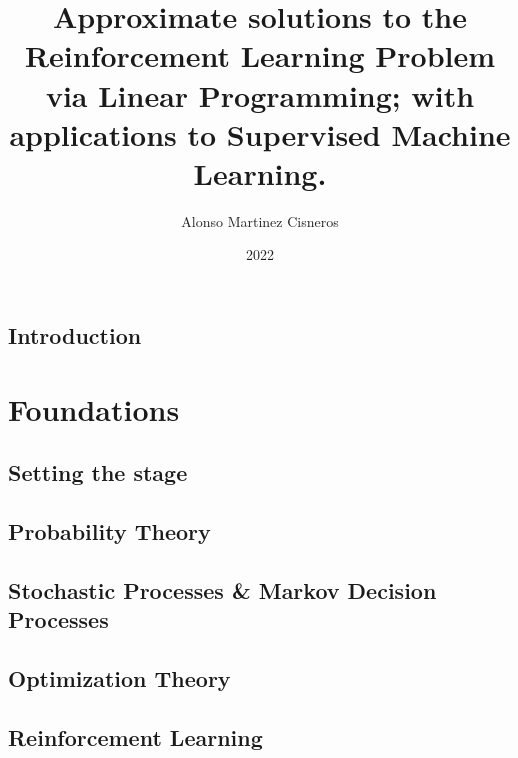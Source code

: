 \documentclass[colorful]{sty/itam-thesis}
\author{Alonso Martinez Cisneros}
\title{Approximate solutions to the Reinforcement Learning 
Problem via Linear Programming; with applications to Supervised 
Machine Learning.}
\date{2022}
\begin{document}
\frontmatter
{}
\maketitle
\makefrontmatter

\cleardoublepage




% 

\tableofcontents

\mainmatter


% 
\chapter*{Introduction}
% 

\part{Foundations}

\chapter{Setting the stage}
% 

\chapter{Probability Theory}

\chapter{Stochastic Processes \& Markov Decision Processes}
% 

\chapter{Optimization Theory}

\chapter{Reinforcement Learning}

\end{document}
